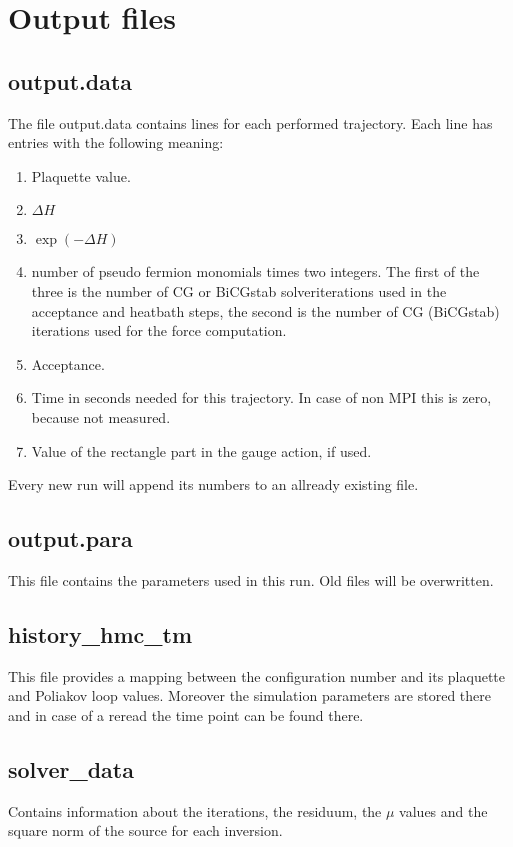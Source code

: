 \section{Output files}

\subsection*{\ttfamily output.data}

The file {\ttfamily output.data} contains lines for each performed
trajectory. Each line has entries with the following meaning:
\begin{enumerate}
\item Plaquette value.
\item $\Delta H$
\item $\exp(-\Delta H)$
\item number of pseudo fermion monomials times two integers. The first
  of the three is the number of CG or BiCGstab solveriterations used
  in the acceptance and heatbath steps, the second is the number of CG
  (BiCGstab) iterations used for the force computation.
\item Acceptance.
\item Time in seconds needed for this trajectory. In case of non MPI
  this is zero, because not measured.
\item Value of the rectangle part in the gauge action, if used.
\end{enumerate}
Every new run will append its numbers to an allready existing file.

\subsection*{\ttfamily output.para}
This file contains the parameters used in this run. Old files will be
overwritten. 

\subsection*{\ttfamily history\_hmc\_tm}
This file provides a mapping between the configuration number and its
plaquette and Poliakov loop values. Moreover the simulation parameters
are stored there and in case of a reread the time point can be found there. 

\subsection*{\ttfamily solver\_data}
Contains information about the iterations, the residuum, the $\mu$
values and the square norm of the source for each inversion.

